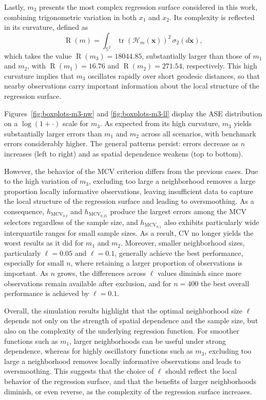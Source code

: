 \documentclass[12pt]{report} %
\newcommand{\bx}{\mathbf{x}}
\begin{document}
Lastly, $m_3$ presents the most complex regression surface considered in this work, combining trigonometric variation in both $x_1$ and $x_2$. Its complexity is reflected in its curvature, defined as
\begin{equation*}
    \operatorname{R}(m) = \int_{\mathbb{S}^2} 
    \operatorname{tr}\!\left(\mathcal{H}_m(\bx)\right)^2
    \,\sigma_2(d\bx),
\end{equation*}
which takes the value $\operatorname{R}(m_3) = 18044.85$, substantially larger than those of $m_1$ and $m_2$, with $\operatorname{R}(m_1) = 16.76$ and $\operatorname{R}(m_2) = 271.54$, respectively. This high curvature implies that $m_3$ oscillates rapidly over short geodesic distances, so that nearby observations carry important information about the local structure of the regression surface.


Figures~\ref{fig:boxplots-m3-nw} and \ref{fig:boxplots-m3-ll} display the ASE distribution on a $\log(1+\cdot)$ scale for $m_3$. As expected from its high curvature, $m_3$ yields substantially larger errors than $m_1$ and $m_2$ across all scenarios, with benchmark errors considerably higher. The general patterns persist: errors decrease as $n$ increases (left to right) and as spatial dependence weakens (top to bottom).

However, the behavior of the MCV criterion differs from the previous cases. Due to the high variation of $m_3$, excluding too large a neighborhood removes a large proportion locally informative observations, leaving insufficient data to capture the local structure of the regression surface and leading to oversmoothing. As a consequence, $h_{\mathrm{MCV}_{0.2}}$ and $h_{\mathrm{MCV}_{0.25}}$ produce the largest errors among the MCV selectors regardless of the sample size, and $h_{\mathrm{MCV}_{0.1}}$ also exhibits particularly wide interquartile ranges for small sample sizes. As a result, CV no longer yields the worst results as it did for $m_1$ and $m_2$. Moreover, smaller neighborhood sizes, particularly $\ell=0.05$ and $\ell=0.1$, generally achieve the best performance, especially for small $n$, where retaining a larger proportion of observations is important. As $n$ grows, the differences across $\ell$ values diminish since more observations remain available after exclusion, and for $n=400$ the best overall performance is achieved by $\ell=0.1$.

Overall, the simulation results highlight that the optimal neighborhood size $\ell$ depends not only on the strength of spatial dependence and the sample size, but also on the complexity of the underlying regression function. For smoother functions such as $m_1$, larger neighborhoods can be useful under strong dependence, whereas for highly oscillatory functions such as $m_3$, excluding too large a neighborhood removes locally informative observations and leads to oversmoothing. This suggests that the choice of $\ell$ should reflect the local behavior of the regression surface, and that the benefits of larger neighborhoods diminish, or even reverse, as the complexity of the regression surface increases.
\end{document}
